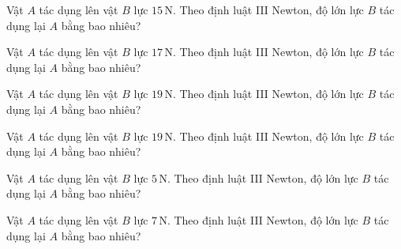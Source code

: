 \begin{ex}
Vật $A$ tác dụng lên vật $B$ lực $15\,\text{N}$. Theo định luật III Newton, độ lớn lực $B$ tác dụng lại $A$ bằng bao nhiêu?
\end{ex}

\begin{ex}
Vật $A$ tác dụng lên vật $B$ lực $17\,\text{N}$. Theo định luật III Newton, độ lớn lực $B$ tác dụng lại $A$ bằng bao nhiêu?
\end{ex}

\begin{ex}
Vật $A$ tác dụng lên vật $B$ lực $19\,\text{N}$. Theo định luật III Newton, độ lớn lực $B$ tác dụng lại $A$ bằng bao nhiêu?
\end{ex}

\begin{bt}
Vật $A$ tác dụng lên vật $B$ lực $19\,\text{N}$. Theo định luật III Newton, độ lớn lực $B$ tác dụng lại $A$ bằng bao nhiêu?
\end{bt}

\begin{bt}
Vật $A$ tác dụng lên vật $B$ lực $5\,\text{N}$. Theo định luật III Newton, độ lớn lực $B$ tác dụng lại $A$ bằng bao nhiêu?
\end{bt}

\begin{bt}
Vật $A$ tác dụng lên vật $B$ lực $7\,\text{N}$. Theo định luật III Newton, độ lớn lực $B$ tác dụng lại $A$ bằng bao nhiêu?
\end{bt}

